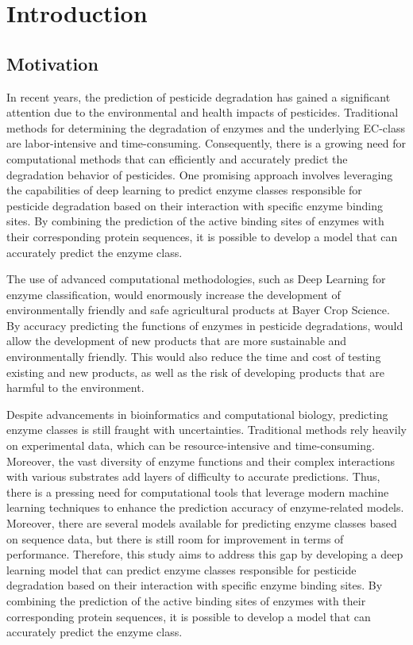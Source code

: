 \section{Introduction}

\subsection{Motivation}
\label{sec:Motivation}

In recent years, the prediction of pesticide degradation has gained a significant attention due to the environmental and health impacts of pesticides. Traditional methods for determining the degradation of enzymes and the underlying EC-class are labor-intensive and time-consuming. Consequently, there is a growing need for computational methods that can efficiently and accurately predict the degradation behavior of pesticides. One promising approach involves leveraging the capabilities of deep learning to predict enzyme classes responsible for pesticide degradation based on their interaction with specific enzyme binding sites. By combining the prediction of the active binding sites of enzymes with their corresponding protein sequences, it is possible to develop a model that can accurately predict the enzyme class.

The use of advanced computational methodologies, such as Deep Learning for enzyme classification, would enormously increase the development of environmentally friendly and safe agricultural products at Bayer Crop Science. By accuracy predicting the functions of enzymes in pesticide degradations, would allow the development of new products that are more sustainable and environmentally friendly. This would also reduce the time and cost of testing existing and new products, as well as the risk of developing products that are harmful to the environment.

Despite advancements in bioinformatics and computational biology, predicting enzyme classes is still fraught with uncertainties. Traditional methods rely heavily on experimental data, which can be resource-intensive and time-consuming. Moreover, the vast diversity of enzyme functions and their complex interactions with various substrates add layers of difficulty to accurate predictions. Thus, there is a pressing need for computational tools that leverage modern machine learning techniques to enhance the prediction accuracy of enzyme-related models. Moreover, there are several models available for predicting enzyme classes based on sequence data, but there is still room for improvement in terms of performance. Therefore, this study aims to address this gap by developing a deep learning model that can predict enzyme classes responsible for pesticide degradation based on their interaction with specific enzyme binding sites. By combining the prediction of the active binding sites of enzymes with their corresponding protein sequences, it is possible to develop a model that can accurately predict the enzyme class.

